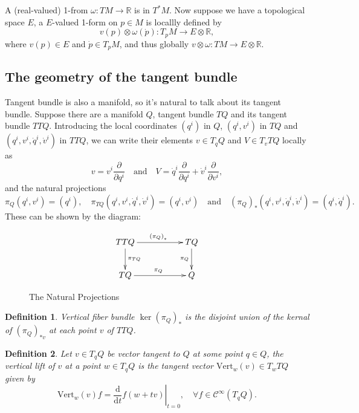 \documentclass[11pt]{article}
\theoremstyle{plain}%
\newtheorem{defi}{Definition}[section]%
\newcommand{\dd}{{\mathrm{d}}}  %
\begin{document}
A (real-valued) 1-from $\omega:TM\rightarrow \mathbb{R}$ is in $T^*\!M$. Now suppose we have a topological space $E$, a $E$-valued 1-form on $p \in M$ is locallly defined by
\[
	v(p)\otimes\omega(\dot{p}):T_pM\rightarrow E\otimes \mathbb{R},
\]
where $v(p)\in E$ and $\dot{p} \in T_p M$, and thus globally $v\otimes\omega:TM\rightarrow E\otimes \mathbb{R}$.

\subsection{The geometry of the tangent bundle}
Tangent bundle is also a manifold, so it's natural to talk about its tangent bundle. Suppose there are a manifold $Q$, tangent bundle $TQ$ and its tangent bundle $TTQ$. Introducing the local coordinates $(q^i)$ in $Q$, $(q^i,v^i)$ in $TQ$ and $(q^i,v^i,\dot{q}^i,\dot{v}^i)$ in $TTQ$, we can write their elements $v \in T_qQ$ and $V \in T_vTQ$ locally as
\[
	v=v^i\frac{\partial}{\partial q^i} \quad\text{and}\quad V=\dot{q}^i\frac{\partial}{\partial q^i}+\dot{v}^i\frac{\partial}{\partial v^i},
\]
and the natural projections
\[
	\pi_Q(q^i,v^i)=(q^i),\quad \pi_{TQ}(q^i,v^i,\dot{q}^i,\dot{v}^i)=(q^i,v^i)\quad\text{and}\quad \left(\pi_{Q}\right)_*(q^i,v^i,\dot{q}^i,\dot{v}^i)=(q^i,\dot{q}^i).
\]
These can be shown by the diagram:
\begin{figure}[htbp]
	\centering
	\[
		\xymatrix{
			TTQ\ar[rr]^{\left(\pi_{Q}\right)_*} \ar[d]^{\pi_{TQ}}&&TQ\ar[d]_{\pi_{Q}}\\
			TQ\ar[rr]^{\pi_{Q}} &&Q
			}
	\]
	\caption{The Natural Projections}
\end{figure}
\begin{defi}
	Vertical fiber bundle $\ker(\pi_Q)_*$ is the disjoint union of the kernal of $(\pi_Q)_{*v}$ at each point $v$ of $TTQ$.
\end{defi}
\begin{defi}
	Let $v \in T_qQ$ be vector tangent to $Q$ at some point $q\in Q$, the vertical lift of $v$ at a point $w\in T_qQ$ is the tangent vector $\mathrm{Vert}_w(v)\in T_wTQ$ given by
	\[
		\mathrm{Vert}_w(v)f=\left.\frac{\dd}{\dd t}f(w+tv)\right|_{t=0},\quad \forall f\in \mathcal{C}^\infty(T_qQ).
	\]
\end{defi}
\end{document}
